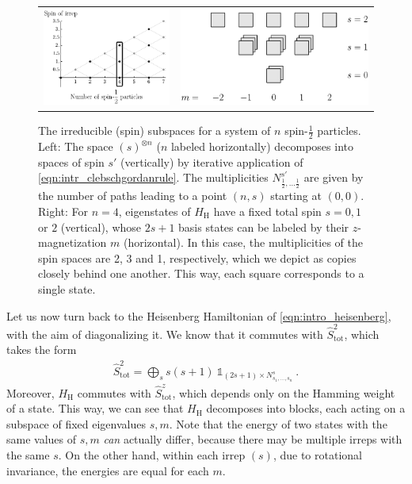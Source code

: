 \begin{figure} 
\begin{tabular}{m{} m{}}
  \vspace{0pt} \includegraphics[width=.46\textwidth]{img/ClebschGordanDiagram.pdf} &
  \vspace{0pt} \includegraphics[width=.43\textwidth]{img/HeisenbergSubspaces_flat.pdf} 
\end{tabular}
\caption{The irreducible (spin) subspaces for a system of $n$ spin-$\frac{1}{2}$ particles. Left: The space $(s)^{\otimes n}$ ($n$ labeled horizontally) decomposes into spaces of spin $s'$ (vertically) by iterative application of \cref{eqn:intr_clebschgordanrule}. The multiplicities $N^{s'}_{\frac{1}{2}, \ldots \frac{1}{2}}$ are given by the number of paths leading to a point $(n,s)$ starting at $(0,0)$. Right: For $n=4$, eigenstates of $H_\text{H}$ have a fixed total spin $s =0, 1$ or $2$ (vertical), whose $2s+1$ basis states can be labeled by their $z$-magnetization $m$ (horizontal). In this case, the multiplicities of the spin spaces are 2, 3 and 1, respectively, which we depict as copies closely behind one another. This way, each square corresponds to a single state.   }
\label{fig:clebschgordan}
\end{figure}



Let us now turn back to the Heisenberg Hamiltonian of \cref{eqn:intro_heisenberg}, with the aim of diagonalizing it. We know that it commutes with $\hat{S}_\text{tot}^2$, which takes the form 
\begin{align*}
\hat{S}_\text{tot}^2 =  \bigoplus_{s} s(s+1) \ \mathds{1}_{(2s+1) \times  N^s_{s_1, \ldots, s_n}}  ~ .
\end{align*}
Moreover, $H_\text{H}$ commutes with $\hat{S}_\text{tot}^z$, which depends only on the Hamming weight of a state. This way, we can see that $H_\text{H}$ decomposes into blocks, each acting on a subspace of fixed eigenvalues $s,m$. Note that the energy of two states with the same values of $s,m$ \emph{can} actually differ, because there may be multiple irreps with the same $s$. On the other hand, within each irrep $(s)$, due to rotational invariance, the energies are equal for each $m$. 

